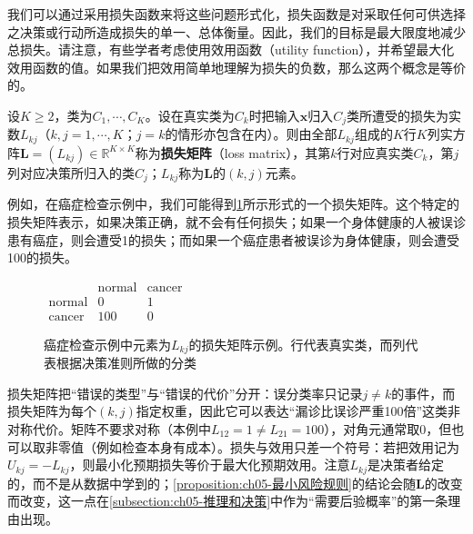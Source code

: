 \documentclass[../../main.tex]{subfiles}
\begin{document}
我们可以通过采用损失函数来将这些问题形式化，损失函数是对采取任何可供选择之决策或行动所造成损失的单一、总体衡量。因此，我们的目标是最大限度地减少总损失。请注意，有些学者考虑使用效用函数（utility function），并希望最大化效用函数的值。如果我们把效用简单地理解为损失的负数，那么这两个概念是等价的。

\begin{definition}[损失矩阵]\label{definition:ch05-损失矩阵}
设$K\geqslant2$，类为$C_1,\cdots,C_K$。设在真实类为$C_k$时把输入$\boldsymbol{x}$归入$C_j$类所遭受的损失为实数$L_{kj}$（$k,j=1,\cdots,K$；$j=k$的情形亦包含在内）。则由全部$L_{kj}$组成的$K$行$K$列实方阵$\boldsymbol{L}=(L_{kj})\in\mathbb{R}^{K\times K}$称为\textbf{损失矩阵}（loss matrix），其第$k$行对应真实类$C_k$，第$j$列对应决策所归入的类$C_j$；$L_{kj}$称为$\boldsymbol{L}$的$(k,j)$元素。
\end{definition}

例如，在癌症检查示例中，我们可能得到\cref{figure:ch05-损失矩阵}所示形式的一个损失矩阵。这个特定的损失矩阵表示，如果决策正确，就不会有任何损失；如果一个身体健康的人被误诊患有癌症，则会遭受1的损失；而如果一个癌症患者被误诊为身体健康，则会遭受100的损失。

\begin{figure}[htbp]
  \centering
  $\begin{array}{c|cc}
    & \text{normal} & \text{cancer}\\\hline
    \text{normal} & 0 & 1\\
    \text{cancer} & 100 & 0
  \end{array}$
  \caption{癌症检查示例中元素为$L_{kj}$的损失矩阵示例。行代表真实类，而列代表根据决策准则所做的分类}
  \label{figure:ch05-损失矩阵}
\end{figure}

\begin{remark}
损失矩阵把“错误的类型”与“错误的代价”分开：误分类率只记录$j\neq k$的事件，而损失矩阵为每个$(k,j)$指定权重，因此它可以表达“漏诊比误诊严重100倍”这类非对称代价。矩阵不要求对称（本例中$L_{12}=1\neq L_{21}=100$），对角元通常取0，但也可以取非零值（例如检查本身有成本）。损失与效用只差一个符号：若把效用记为$U_{kj}=-L_{kj}$，则最小化预期损失等价于最大化预期效用。注意$L_{kj}$是决策者给定的，而不是从数据中学到的；\cref{proposition:ch05-最小风险规则}的结论会随$\boldsymbol{L}$的改变而改变，这一点在\cref{subsection:ch05-推理和决策}中作为“需要后验概率”的第一条理由出现。
\end{remark}
\end{document}
